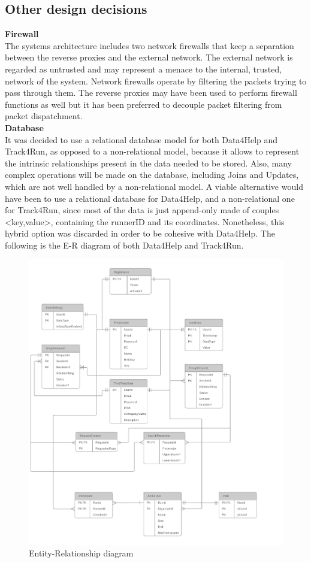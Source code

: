 \documentclass[titlepage]{article}
\begin{document}
\subsection{Other design decisions}

{\bf Firewall}\\
The systems architecture includes two network firewalls that keep a separation between the reverse proxies and the external network. The external network is regarded as untrusted and may represent a menace to the internal, trusted, network of the system.
Network firewalls operate by filtering the packets trying to pass through them.
The reverse proxies may have been used to perform firewall functions as well but it has been preferred to decouple packet filtering from packet dispatchment.\\

{\bf Database}\\
It was decided to use a relational database model for both Data4Help and Track4Run, as opposed to a non-relational model, because it allows to represent the intrinsic relationships present in the data needed to be stored. Also, many complex operations will be made on the database, including Joins and Updates, which are not well handled by a non-relational model. 
A viable alternative would have been to use a relational database for Data4Help, and a non-relational one for Track4Run, since most of the data is just append-only made of couples <key,value>, containing the runnerID and its coordinates. Nonetheless, this hybrid option was discarded in order to be cohesive with Data4Help.
The following is the E-R diagram of both Data4Help and Track4Run.

\begin{figure}[H]
	\center
  	\includegraphics[width=15cm]{ER.png}
  	\caption{Entity-Relationship diagram}
 	\label{fig:ER}
\end{figure}
\end{document}
